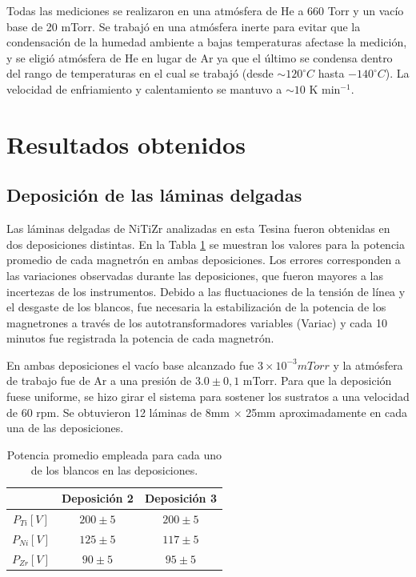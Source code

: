 \documentclass[12pt]{article}
\theoremstyle{definition}
\theoremstyle{remark}
\begin{document}
{Todas las mediciones se realizaron en una atmósfera de He a 660 Torr y un vacío base de 20 mTorr. Se trabajó en una atmósfera inerte para evitar que la condensación de la humedad ambiente a bajas temperaturas afectase la medición, y se eligió atmósfera de He en lugar de Ar ya que el último se condensa dentro del rango de temperaturas en el cual se trabajó (desde $\sim 120 ^\circ C$ hasta $-140 ^\circ C$). La velocidad de enfriamiento y calentamiento se mantuvo a $\sim10$ K min$^{-1}$.

\newpage
\section{Resultados obtenidos}

\subsection{Deposición de las láminas delgadas}

Las láminas  delgadas de NiTiZr analizadas en esta Tesina fueron obtenidas en dos deposiciones distintas. En la Tabla \ref{potencias} se muestran los valores para la potencia promedio de cada magnetrón en ambas deposiciones. Los errores corresponden a las variaciones observadas durante las deposiciones, que fueron mayores a las incertezas de los instrumentos. Debido a las fluctuaciones de la tensión de línea y el desgaste de los blancos, fue necesaria la estabilización de la potencia de los magnetrones a través de los autotransformadores variables (Variac) y cada 10 minutos fue registrada la potencia de cada magnetrón.

En ambas deposiciones el vacío base alcanzado fue $3 \times 10^{-3}mTorr$ y la atmósfera de trabajo fue de Ar a una presión de $3.0 \pm 0,1$ mTorr. Para que la deposición fuese uniforme, se hizo girar el sistema para sostener los sustratos a una velocidad de 60 rpm. Se obtuvieron 12 láminas de 8mm $\times$ 25mm aproximadamente en cada una de las deposiciones.

\begin{table}[H]
\centering
\begin{tabular}{|c|c|c|}
\hline
 & Deposición 2 & Deposición 3 \\ \hline
$P_{Ti}[V]$ & $200 \pm 5$ & $200 \pm 5$ \\ \hline
$P_{Ni}[V]$ & $125 \pm 5$ & $117 \pm 5$ \\ \hline
$P_{Zr}[V]$ & $90 \pm 5$ & $95 \pm 5$ \\ \hline
\end{tabular}
\caption{Potencia promedio empleada para cada uno de los blancos en las deposiciones.}
\label{potencias}
\end{table}

}
\end{document}
